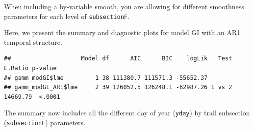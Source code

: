 \documentclass[
]{book}
\begin{document}
When including a by-variable smooth, you are allowing for different smoothness parameters for each level of \texttt{subsectionF}.

Here, we present the summary and diagnostic plots for model GI with an AR1 temporal structure.

\begin{verbatim}
##                    Model df      AIC      BIC    logLik   Test  L.Ratio p-value
## gamm_modGI$lme         1 38 111380.7 111571.3 -55652.37                        
## gamm_modGI_AR1$lme     2 39 126052.5 126248.1 -62987.26 1 vs 2 14669.79  <.0001
\end{verbatim}

The summary now includes all the different day of year (\texttt{yday}) by trail subsection (\texttt{subsectionF}) parameters.
\end{document}
